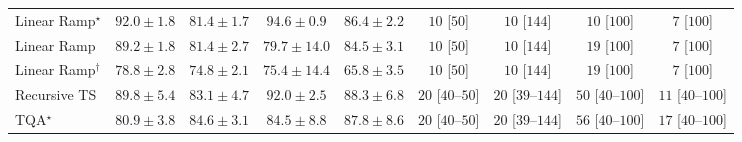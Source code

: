 \begin{tabular}{l|cccc|cccc|}
Linear Ramp$^\star$ & {\cellcolor[HTML]{760C71}} \color[HTML]{F1F1F1} $92.0\pm 1.8$ & {\cellcolor[HTML]{8B5CAA}} \color[HTML]{F1F1F1} $81.4\pm 1.7$ & {\cellcolor[HTML]{5D055A}} \color[HTML]{F1F1F1} $94.6\pm 0.9$ & {\cellcolor[HTML]{863595}} \color[HTML]{F1F1F1} $86.4\pm 2.2$ & {\cellcolor[HTML]{FFF7F3}} \color[HTML]{000000} $10$ [$50$] & {\cellcolor[HTML]{FFF7F3}} \color[HTML]{000000} $10$ [$144$] & {\cellcolor[HTML]{FFF7F3}} \color[HTML]{000000} $10$ [$100$] & {\cellcolor[HTML]{FFF7F3}} \color[HTML]{000000} $7$ [$100$] \\
Linear Ramp & {\cellcolor[HTML]{831C84}} \color[HTML]{F1F1F1} $89.2\pm 1.8$ & {\cellcolor[HTML]{8B5CAA}} \color[HTML]{F1F1F1} $81.4\pm 2.7$ & {\cellcolor[HTML]{8C69B0}} \color[HTML]{F1F1F1} $79.7\pm 14.0$ & {\cellcolor[HTML]{88459F}} \color[HTML]{F1F1F1} $84.5\pm 3.1$ & {\cellcolor[HTML]{FFF7F3}} \color[HTML]{000000} $10$ [$50$] & {\cellcolor[HTML]{FFF7F3}} \color[HTML]{000000} $10$ [$144$] & {\cellcolor[HTML]{FFF5F1}} \color[HTML]{000000} $19$ [$100$] & {\cellcolor[HTML]{FFF7F3}} \color[HTML]{000000} $7$ [$100$] \\
Linear Ramp$^\dagger$ & {\cellcolor[HTML]{8C70B3}} \color[HTML]{F1F1F1} $78.8\pm 2.8$ & {\cellcolor[HTML]{8C8DC2}} \color[HTML]{F1F1F1} $74.8\pm 2.1$ & {\cellcolor[HTML]{8C89C0}} \color[HTML]{F1F1F1} $75.4\pm 14.4$ & {\cellcolor[HTML]{ABC5DF}} \color[HTML]{000000} $65.8\pm 3.5$ & {\cellcolor[HTML]{FFF7F3}} \color[HTML]{000000} $10$ [$50$] & {\cellcolor[HTML]{FFF7F3}} \color[HTML]{000000} $10$ [$144$] & {\cellcolor[HTML]{FFF5F1}} \color[HTML]{000000} $19$ [$100$] & {\cellcolor[HTML]{FFF7F3}} \color[HTML]{000000} $7$ [$100$] \\
Recursive TS & {\cellcolor[HTML]{821781}} \color[HTML]{F1F1F1} $89.8\pm 5.4$ & {\cellcolor[HTML]{8950A4}} \color[HTML]{F1F1F1} $83.1\pm 4.7$ & {\cellcolor[HTML]{760C71}} \color[HTML]{F1F1F1} $92.0\pm 2.5$ & {\cellcolor[HTML]{84258B}} \color[HTML]{F1F1F1} $88.3\pm 6.8$ & {\cellcolor[HTML]{FFF4F0}} \color[HTML]{000000} $20$ [$40$--$50$] & {\cellcolor[HTML]{FFF4F0}} \color[HTML]{000000} $20$ [$39$--$144$] & {\cellcolor[HTML]{FEEDE9}} \color[HTML]{000000} $50$ [$40$--$100$] & {\cellcolor[HTML]{FFF6F2}} \color[HTML]{000000} $11$ [$40$--$100$] \\
TQA$^\star$ & {\cellcolor[HTML]{8B60AC}} \color[HTML]{F1F1F1} $80.9\pm 3.8$ & {\cellcolor[HTML]{88449E}} \color[HTML]{F1F1F1} $84.6\pm 3.1$ & {\cellcolor[HTML]{88459F}} \color[HTML]{F1F1F1} $84.5\pm 8.8$ & {\cellcolor[HTML]{85288D}} \color[HTML]{F1F1F1} $87.8\pm 8.6$ & {\cellcolor[HTML]{FFF4F0}} \color[HTML]{000000} $20$ [$40$--$50$] & {\cellcolor[HTML]{FFF4F0}} \color[HTML]{000000} $20$ [$39$--$144$] & {\cellcolor[HTML]{FEEBE8}} \color[HTML]{000000} $56$ [$40$--$100$] & {\cellcolor[HTML]{FFF5F1}} \color[HTML]{000000} $17$ [$40$--$100$] \\

\end{tabular}
